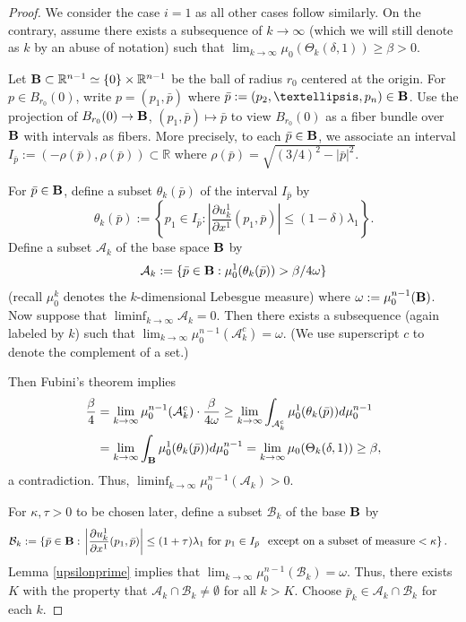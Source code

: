 \documentclass[10pt,a4paper]{amsart}
\newcommand{\R}{\mathbb R}
\begin{document}
\begin{proof} 
We consider the case $i=1$ as all other cases follow similarly.    On the contrary, assume there exists a subsequence of $k \rightarrow \infty$ (which we will still denote as $k$ by an abuse of notation) such that $\lim_{k \to \infty}\mu_0(\Theta_k(\delta, 1)) \geq \beta >0$.


Let ${\bf B} \subset \R^{n-1}\simeq \{0\} \times \R^{n-1}$ be the ball of radius $r_0$ centered at the origin. For $p \in B_{r_0}(0)$, write $p = (p_1, \bar p)$ where $\bar p:= (p_2, \dots, p_n) \in {\bf B}$. 
Use the projection of $B_{r_0}(0) \rightarrow {\bf B}$, $(p_1,\bar p) \mapsto \bar p$ to view $B_{r_0}(0)$ as a fiber bundle over ${\bf B}$ with intervals as fibers.  
More precisely,  to each $\bar p \in {\bf B}$, we associate an interval  $I_{\bar p}:=(-\rho(\bar p), \rho(\bar p)) \subset \R$  where $\rho(\bar p)=\sqrt{(3/4)^2 - |\bar p|^2}$. 


For $\bar p \in {\bf B}$, define a subset $\theta_k(\bar p)$ of the interval $I_{\bar p}$ by 
\[
\theta_k(\bar p):= \left\{p_1 \in I_{\bar p}:  \left| \frac{\partial u^1_k}{\partial x^1} (p_1,\bar p) \right|\leq (1-\delta)\lambda_1\right\}.
\]
 Define a subset   $\mathcal A_k$ of the base space ${\bf B}$ by 
$$\mathcal A_k:= \{\bar p \in {\bf B}: \mu_0^1(\theta_k(\bar p))> \beta/4\omega\}
$$ (recall  $\mu_0^k$ denotes the $k$-dimensional Lebesgue measure) where $\omega:=\mu_0^{n-1}({\bf B})$. 
Now suppose that $\liminf_{k \to \infty} \mathcal A_k =0$. Then there exists a subsequence (again labeled by $k$) such that 
 $\lim_{k \to \infty}\mu_0^{n-1}(\mathcal A_k^c) =\omega$. (We use superscript $c$ to denote the complement of a set.)
 
 Then Fubini's theorem implies
\begin{align*}
\frac{\beta}{4} &= \lim_{k \to \infty}\mu_0^{n-1}(\mathcal A_k^c) \cdot \frac{\beta}{4\omega} \geq \lim_{k \to \infty} \int_{\mathcal A_k^c} \mu_0^1(\theta_k(\bar p)) d\mu_0^{n-1}\\& =\lim_{k \to \infty} \int_{{\bf B}}\mu_0^1(\theta_k(\bar p)) d\mu_0^{n-1}= \lim_{k \to \infty}\mu_0(\Theta_k(\delta, 1)) \geq \beta,
\end{align*}
a contradiction.  Thus, $\liminf_{k \to \infty}\mu_0^{n-1}(\mathcal A_k) >0$. 

For $\kappa, \tau>0$ to be chosen later, define a subset $\mathcal B_k$ of the base ${\bf B}$ by
\begin{align*}
\mathcal B_k:= \left\{ \bar p \in {\bf B}:\right.& \left.\left| \frac{\partial u^1_k}{\partial x^1} (p_1, \bar p) \right|\leq (1+\tau) \lambda_1 \text{ for } p_1 \in I_{\bar p}\right.\left.  \text{ except on a subset of measure}< \kappa \right\}.
\end{align*} 
Lemma \ref{upsilonprime} implies that $\lim_{k \to \infty}\mu_0^{n-1}(\mathcal B_k) = \omega$. Thus,  there exists $K$  with the property that $\mathcal A_k \cap \mathcal B_k \neq \emptyset$ for all $k> K$.  Choose $\bar p_k \in \mathcal A_k \cap \mathcal B_k$ for each $k$.


\end{proof}
\end{document}
